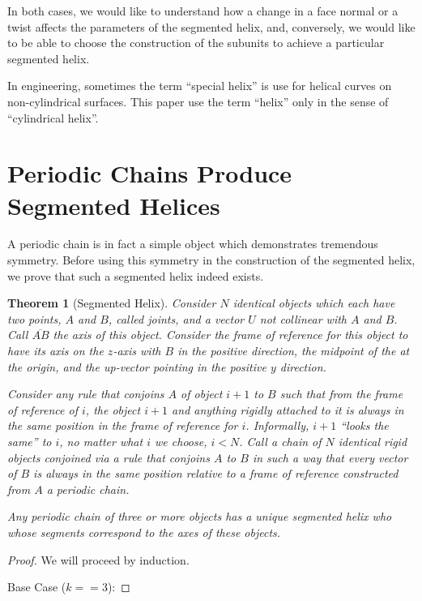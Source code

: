 \documentclass[11pt]{article}
\newtheorem{theorem}{Theorem}
\begin{document}
{In both cases, we would like to understand how a change in a face normal or a twist affects the parameters of the segmented helix,
and, conversely, we would like to be able to choose the construction of the subunits to achieve a particular segmented helix.

In engineering, sometimes the term ``special helix''\cite{gu2012research} is use for helical curves on non-cylindrical surfaces. This paper use the term ``helix'' only in the sense of ``cylindrical helix''.

\section{Periodic Chains Produce Segmented Helices}

A periodic chain is in fact a simple object which demonstrates tremendous symmetry.
Before using this symmetry in the construction of the segmented helix, we
prove that such a segmented helix indeed exists.

\begin{theorem}[Segmented Helix]
  Consider $N$ identical objects which each have two points, $A$ and $B$, called {\em joints},
  and a vector $U$ not collinear with $A$ and $B$. Call
  $\overline{AB}$ the {\em axis} of this object.
  Consider the frame of reference for this object to have
  its axis on the $z$-axis with $B$ in the positive direction, the
  midpoint of the at the origin, and the up-vector pointing in the positive $y$ direction.

  Consider any rule that conjoins $A$ of object $i+1$ to $B$ such that
  from the frame of reference of $i$, the object $i+1$ and anything rigidly
  attached to it is always in the same position in the frame of reference for $i$.
  Informally, $i+1$ ``looks the same'' to $i$, no matter what $i$ we choose, $i < N$.
  Call a chain of $N$ identical rigid objects conjoined via a rule that
  conjoins $A$ to $B$ in such a way that every vector
  of $B$ is always in the same position relative to a frame of reference
  constructed from $A$ a {\em periodic chain.}

  Any periodic chain of three or more objects has a unique segmented helix who
  whose segments correspond
  to the axes of these objects.
\end{theorem}

\begin{proof}
  We will proceed by induction.

  Base Case ($k == 3$):


\end{proof}}
\end{document}
